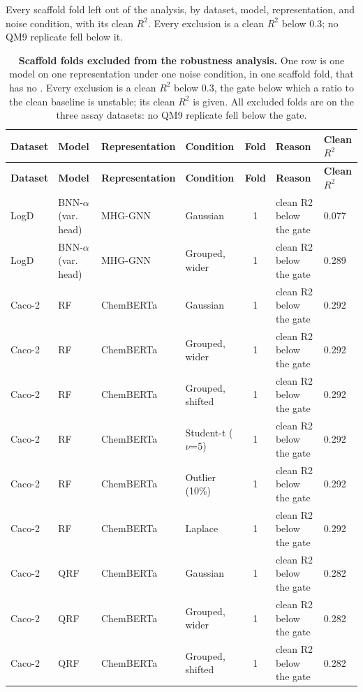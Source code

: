 \clearpage
{}
\label{app:noise:sec:excluded_configurations}
Every scaffold fold left out of the \aucnorm{} analysis, by dataset, model, representation, and noise condition, with its clean $R^2$. Every exclusion is a clean $R^2$ below 0.3; no QM9 replicate fell below it.
{\AFtablefont
\begin{longtable}{llllcll}
\caption{\textbf{Scaffold folds excluded from the robustness analysis.}
One row is one model on one representation under one noise condition, in one scaffold fold, that has no \aucnorm{}. Every exclusion is a clean $R^2$ below 0.3, the gate below which a ratio to the clean baseline is unstable; its clean $R^2$ is given. All excluded folds are on the three assay datasets: no QM9 replicate fell below the gate.}
\label{app:noise:excluded_configurations}\\
\toprule
\textbf{Dataset} & \textbf{Model} & \textbf{Representation} & \textbf{Condition} & \textbf{Fold} & \textbf{Reason} & \textbf{Clean $R^2$} \\
\midrule
\endfirsthead
\toprule
\textbf{Dataset} & \textbf{Model} & \textbf{Representation} & \textbf{Condition} & \textbf{Fold} & \textbf{Reason} & \textbf{Clean $R^2$} \\
\midrule
\endhead
LogD & BNN-$\alpha$ (var. head) & MHG-GNN & Gaussian & 1 & clean R2 below the gate & 0.077 \\
LogD & BNN-$\alpha$ (var. head) & MHG-GNN & Grouped, wider & 1 & clean R2 below the gate & 0.289 \\
Caco-2 & RF & ChemBERTa & Gaussian & 1 & clean R2 below the gate & 0.292 \\
Caco-2 & RF & ChemBERTa & Grouped, wider & 1 & clean R2 below the gate & 0.292 \\
Caco-2 & RF & ChemBERTa & Grouped, shifted & 1 & clean R2 below the gate & 0.292 \\
Caco-2 & RF & ChemBERTa & Student-t ($\nu$=5) & 1 & clean R2 below the gate & 0.292 \\
Caco-2 & RF & ChemBERTa & Outlier (10\%) & 1 & clean R2 below the gate & 0.292 \\
Caco-2 & RF & ChemBERTa & Laplace & 1 & clean R2 below the gate & 0.292 \\
Caco-2 & QRF & ChemBERTa & Gaussian & 1 & clean R2 below the gate & 0.282 \\
Caco-2 & QRF & ChemBERTa & Grouped, wider & 1 & clean R2 below the gate & 0.282 \\
Caco-2 & QRF & ChemBERTa & Grouped, shifted & 1 & clean R2 below the gate & 0.282 \\

\end{longtable}}
